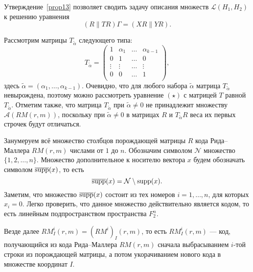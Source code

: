 Утверждение~\ref{prop13} позволяет сводить задачу описания множеств
$\mathcal L(H_1,H_2)$ к решению уравнения
$$
(R\|TR)\Gamma=(XR\|YR).
$$

Рассмотрим матрицы $T_{\widetilde\alpha}$ следующего типа:
$$
T_{\widetilde\alpha}=
\begin{pmatrix}
1&\alpha_1&\ldots&\alpha_{k-1}\\
0&1&\ldots&0\\
\vdots&\vdots&\ldots&\vdots\\
0&0&\ldots&1\\
\end{pmatrix},
$$
здесь $\widetilde\alpha=(\alpha_1,\ldots,\alpha_{k-1})$. Очевидно,
что для любого набора $\widetilde\alpha$ матрица
$T_{\widetilde\alpha}$ невырождена, поэтому можно рассмотреть
уравнение $(\star)$ с матрицей $T$ равной $T_{\widetilde\alpha}$.
Отметим также, что матрица $T_{\widetilde\alpha}$ при
$\widetilde\alpha\ne 0$ не принадлежит множеству $\mathcal
A(RM(r,m))$, поскольку при $\widetilde\alpha\ne 0$ в матрицах $R$
и $T_{\widetilde\alpha}R$ веса их первых строчек будут отличаться.

Занумеруем всё множество столбцов порождающей матрицы $R$ кода
Рида--Маллера $RM(r,m)$ числами от $1$ до $n$. Обозначим символом
$\mathcal N$ множество $\{1,2,\ldots,n\}$. 
Множество дополнительное к носителю вектора $x$ будем обозначать
символом $\overline{\operatorname{supp}}(x)$, то есть
$$
\overline{\operatorname{supp}}(x)=\mathcal N\setminus \operatorname{supp}(x).
$$
Заметим, что множество $\overline{\operatorname{supp}}(x)$ состоит из тех номеров
$i=1,\ldots,n$, для которых $x_i=0$. 
Легко проверить, что данное множество действительно является
кодом, то есть линейным подпространством пространства $F_2^n$.


Везде далее $RM^{i}_I(r,m)=(RM^i)_I(r,m)$, то есть $RM^i_I(r,m)$
--- код, получающийся из кода Рида--Маллера $RM(r,m)$ сначала
выбрасыванием $i$-той строки из порождающей матрицы, а потом
укорачиванием нового кода в множестве координат $I$.

